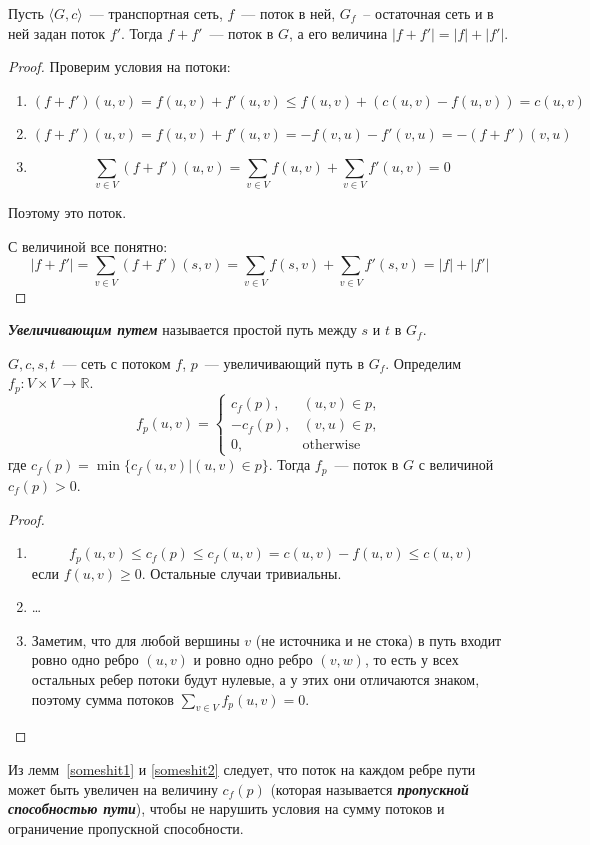\begin{lemma}\label{someshit1} %
	Пусть $\langle G,c\rangle$~--- транспортная сеть, $f$~--- поток в ней, $G_f$~-- остаточная сеть и в ней задан поток $f'$. Тогда $f+f'$~--- поток в $G$, а его величина $|f+f'|=|f|+|f'|$.
\end{lemma}
\begin{proof}
	Проверим условия на потоки:
	\begin{enumerate}
		\item $$(f+f')(u,v)=f(u,v)+f'(u,v)\le f(u,v)+(c(u,v)-f(u,v))=c(u,v)$$
		\item $$(f+f')(u,v)=f(u,v)+f'(u,v)=-f(v,u)-f'(v,u)=-(f+f')(v,u)$$
		\item $$\sum_{v\in V}(f+f')(u,v)=\sum_{v\in V}f(u,v)+\sum_{v\in V}f'(u,v)=0$$
	\end{enumerate}
	Поэтому это поток.
	
	С величиной все понятно:
	$$|f+f'|=\sum_{v\in V}(f+f')(s,v)=\sum_{v\in V}f(s,v)+\sum_{v\in V}f'(s,v)=|f|+|f'|$$
\end{proof}
\begin{definition}
	{\bf\it Увеличивающим путем} называется простой путь между $s$ и $t$ в $G_f$.
\end{definition}
\begin{lemma}\label{someshit2}
	$G,c,s,t$~--- сеть с потоком $f$, $p$~--- увеличивающий путь в $G_f$. Определим $f_p\colon V\times V\to\mathbb{R}$.
	$$
	f_p(u,v)=
	\begin{cases}
		c_f(p), & (u,v)\in p,\\
		-c_f(p), & (v,u)\in p,\\
		0, & \mathrm{otherwise}
	\end{cases}
	$$
	где $c_f(p)=\min\{c_f(u,v)|(u,v)\in p\}$.
	Тогда $f_p$~--- поток в $G$ с величиной $c_f(p)>0$.
\end{lemma}
\begin{proof}$ $\newline
	\begin{enumerate}
		\item $$f_p(u,v)\le c_f(p)\le c_f(u,v)=c(u,v)-f(u,v)\le c(u,v)$$ если $f(u,v)\ge 0$. Остальные случаи тривиальны.
		\item \ldots
		\item Заметим, что для любой вершины $v$ (не источника и не стока) в путь входит ровно одно ребро $(u,v)$ и ровно одно ребро $(v,w)$, то есть у всех остальных ребер потоки будут нулевые, а у этих они отличаются знаком, поэтому сумма потоков  $\sum_{v\in V}f_p(u,v)=0$.
	\end{enumerate}
\end{proof}
Из лемм~\ref{someshit1} и \ref{someshit2} следует, что поток на каждом ребре пути может быть увеличен на величину $c_f(p)$ (которая называется {\bf\it пропускной способностью пути}), чтобы не нарушить условия на сумму потоков и ограничение пропускной способности.


